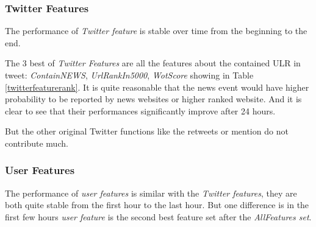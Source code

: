  \subsubsection{Twitter Features} 
   The performance of \emph{Twitter feature} is stable over time from the beginning to the end.

 The 3 best of \emph{Twitter Features} are all the features about the contained ULR in tweet: \emph{ContainNEWS}, \emph{UrlRankIn5000}, \emph{WotScore} showing in Table \ref{twitterfeaturerank}. It is quite reasonable that the news event would have higher probability to be reported by news websites or higher ranked website. And it is clear to see that their performances significantly improve after 24 hours.
 

 But the other original Twitter functions like the retweets or mention do not contribute much.
 

\begin{table}[!h]
\centering
{}
\caption{Rank of Part of Twitter Feature}
\label{twitterfeaturerank}
\end{table}

\subsubsection{User Features} 
The performance of \emph{user features} is similar with the \emph{Twitter features}, they are both quite stable from the first hour to the last hour. But one difference is in the first few hours \emph{user feature} is the second best feature set after the \emph{AllFeatures set}.


